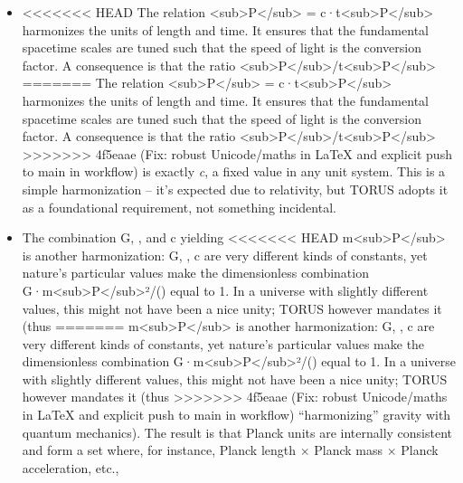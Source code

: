 \documentclass[]{article}
\begin{document}
\begin{itemize}
\item
<<<<<<< HEAD
  The relation \ell\textless sub\textgreater P\textless/sub\textgreater{} =
  c·t\textless sub\textgreater P\textless/sub\textgreater{} harmonizes
  the units of length and time. It ensures that the fundamental
  spacetime scales are tuned such that the speed of light is the
  conversion factor. A consequence is that the ratio
  \ell\textless sub\textgreater P\textless/sub\textgreater/t\textless sub\textgreater P\textless/sub\textgreater{}
=======
  The relation
  \ell\textless{}sub\textgreater{}P\textless{}/sub\textgreater{} =
  c·t\textless{}sub\textgreater{}P\textless{}/sub\textgreater{}
  harmonizes the units of length and time. It ensures that the
  fundamental spacetime scales are tuned such that the speed of light is
  the conversion factor. A consequence is that the ratio
  \ell\textless{}sub\textgreater{}P\textless{}/sub\textgreater{}/t\textless{}sub\textgreater{}P\textless{}/sub\textgreater{}
>>>>>>> 4f5eaae (Fix: robust Unicode/maths in LaTeX and explicit push to main in workflow)
  is exactly \emph{c}, a fixed value in any unit system. This is a
  simple harmonization -- it's expected due to relativity, but TORUS
  adopts it as a foundational requirement, not something incidental.
\item
  The combination G, \hbar, and c yielding
<<<<<<< HEAD
  m\textless sub\textgreater P\textless/sub\textgreater{} is another
  harmonization: G, \hbar, c are very different kinds of constants, yet
  nature's particular values make the dimensionless combination
  G·m\textless sub\textgreater P\textless/sub\textgreater²/(\hbarc) equal to
  1\hspace{0pt}. In a universe with slightly different values, this
  might not have been a nice unity; TORUS however mandates it (thus
=======
  m\textless{}sub\textgreater{}P\textless{}/sub\textgreater{} is another
  harmonization: G, \hbar, c are very different kinds of constants, yet
  nature's particular values make the dimensionless combination
  G·m\textless{}sub\textgreater{}P\textless{}/sub\textgreater{}²/(\hbarc)
  equal to 1​. In a universe with slightly different values, this might
  not have been a nice unity; TORUS however mandates it (thus
>>>>>>> 4f5eaae (Fix: robust Unicode/maths in LaTeX and explicit push to main in workflow)
  ``harmonizing'' gravity with quantum mechanics). The result is that
  Planck units are internally consistent and form a set where, for
  instance, Planck length × Planck mass × Planck acceleration, etc.,

\end{itemize}
\end{document}
